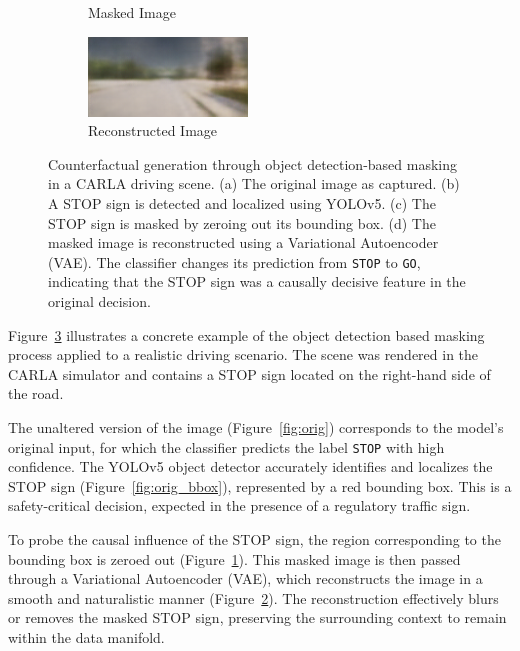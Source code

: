 \begin{figure}[htbp]
\begin{subfigure}[b]{0.24\textwidth}
    \caption{Masked Image}
    \label{fig:masked}
\end{subfigure}
\hfill
\begin{subfigure}[b]{0.24\textwidth}
    \includegraphics[width=\textwidth]{img/masking/object_detection/CE.png}
    \caption{Reconstructed Image}
    \label{fig:reconstructed}
\end{subfigure}
\caption{
Counterfactual generation through object detection-based masking in a CARLA driving scene. (a) The original image as captured. (b) A STOP sign is detected and localized using YOLOv5. (c) The STOP sign is masked by zeroing out its bounding box. (d) The masked image is reconstructed using a Variational Autoencoder (VAE). The classifier changes its prediction from \texttt{STOP} to \texttt{GO}, indicating that the STOP sign was a causally decisive feature in the original decision.
}
\label{fig:object_detection_masking}
\end{figure}


Figure~\ref{fig:object_detection_masking} illustrates a concrete example of the object detection based masking process applied to a realistic driving scenario. The scene was rendered in the CARLA simulator and contains a STOP sign located on the right-hand side of the road.

The unaltered version of the image (Figure~\ref{fig:orig}) corresponds to the model's original input, for which the classifier predicts the label \texttt{STOP} with high confidence. The YOLOv5 object detector accurately identifies and localizes the STOP sign (Figure~\ref{fig:orig_bbox}), represented by a red bounding box. This is a safety-critical decision, expected in the presence of a regulatory traffic sign.

To probe the causal influence of the STOP sign, the region corresponding to the bounding box is zeroed out (Figure~\ref{fig:masked}). This masked image is then passed through a Variational Autoencoder (VAE), which reconstructs the image in a smooth and naturalistic manner (Figure~\ref{fig:reconstructed}). The reconstruction effectively blurs or removes the masked STOP sign, preserving the surrounding context to remain within the data manifold.

